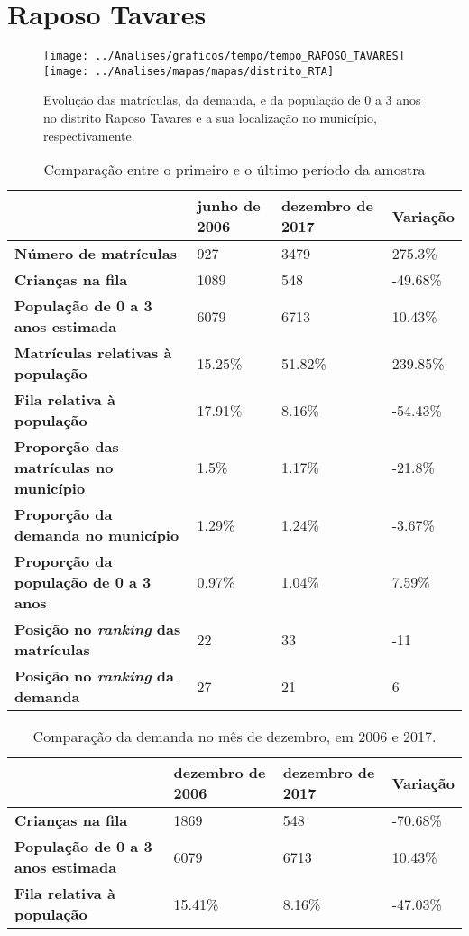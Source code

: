 \section{Raposo Tavares}
\begin{figure}[H]
	\centering
	\texttt{[image: ../Analises/graficos/tempo/tempo\_RAPOSO\_TAVARES]}
	\texttt{[image: ../Analises/mapas/mapas/distrito\_RTA]}
	\caption{Evolução das matrículas, da demanda, e da população de 0 a 3 anos no distrito Raposo Tavares e a sua localização no município, respectivamente.}
\end{figure}
\begin{table}[H]
	\begin{tabular}{|l|l|l|l|}
		\hline
		\textbf{}                                      & \textbf{junho de 2006}       & \textbf{dezembro de 2017}    & \textbf{Variação} \\ \hline
		\textbf{Número de matrículas}                  & 927 & 3479 & 275.3\% \\ \hline
		\textbf{Crianças na fila}                      & 1089 & 548 & -49.68\% \\ \hline
		\textbf{População de 0 a 3 anos estimada}      & 6079 & 6713 & 10.43\% \\ \hline
		\textbf{Matrículas relativas à população}      & 15.25\% & 51.82\% & 239.85\% \\ \hline
		\textbf{Fila relativa à população}             & 17.91\% & 8.16\% & -54.43\% \\ \hline
		\textbf{Proporção das matrículas no município} & 1.5\% & 1.17\% & -21.8\% \\ \hline
		\textbf{Proporção da demanda no município}     & 1.29\% & 1.24\% & -3.67\% \\ \hline
		\textbf{Proporção da população de 0 a 3 anos}  & 0.97\% & 1.04\% & 7.59\% \\ \hline
		\textbf{Posição no \textit{ranking} das matrículas}     & 22 & 33 & -11 \\ \hline
		\textbf{Posição no \textit{ranking} da demanda}         & 27 & 21 & 6 \\ \hline
	\end{tabular}
	\caption{Comparação entre o primeiro e o último período da amostra}
\end{table}
\begin{table}[H]
	\begin{tabular}{|l|l|l|l|}
		\hline
		\textbf{}                                 & \textbf{dezembro de 2006} & \textbf{dezembro de 2017} & \textbf{Variação} \\ \hline
		\textbf{Crianças na fila}                      & 1869 & 548 & -70.68\% \\ \hline
		\textbf{População de 0 a 3 anos estimada}      & 6079 & 6713 & 10.43\% \\ \hline
		\textbf{Fila relativa à população}             & 15.41\% & 8.16\% & -47.03\% \\ \hline
	\end{tabular}
	\caption{Comparação da demanda no mês de dezembro, em 2006 e 2017.}
\end{table}
